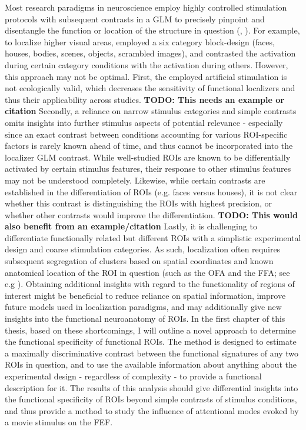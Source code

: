 \documentclass[a4paper, 12pt]{scrreprt}
\begin{document}
Most research paradigms in neuroscience employ highly controlled stimulation protocols with subsequent contrasts in a GLM to precisely pinpoint and disentangle the function or location of the structure in question (\cite{Kanwisher11163},  \cite{fox2009defining}). For example, to localize higher visual areas, \textcite{sengupta2016studyforrest} employed a six category block-design (faces, houses, bodies, scenes, objects, scrambled images), and contrasted the activation during certain category conditions with the activation during others. However, this approach may not be optimal. 
First, the employed artificial stimulation is not ecologically valid, which decreases the sensitivity of functional localizers and thus their applicability across studies. \textbf{TODO: This needs an example or citation} Secondly, a reliance on narrow stimulus categories and simple contrasts omits insights into further stimulus aspects of potential relevance - especially since an exact contrast between conditions accounting for various ROI-specific factors is rarely known ahead of time, and thus cannot be incorporated into the localizer GLM contrast. While well-studied ROIs are known to be differentially activated by certain stimulus features, their response to other stimulus features may not be understood completely. Likewise, while certain contrasts are established in the differentiation of ROIs (e.g. faces versus houses), it is not clear whether this contrast is distinguishing the ROIs with highest precision, or whether other contrasts would improve the differentiation. \textbf{TODO: This would also benefit from an example/citation} Lastly, it is challenging to differentiate functionally related but different ROIs with a simplistic experimental design and coarse stimulation categories. As such, localization often requires subsequent segregation of clusters based on spatial coordinates and known anatomical location of the ROI in question (such as the OFA and the FFA; see e.g \cite{sengupta2016studyforrest}).
Obtaining additional insights with regard to the functionality of regions of interest might be beneficial to reduce reliance on spatial information, improve future models used in localization paradigms, and may additionally give new insights into the functional neuroanatomy of ROIs.\newline
In the first chapter of this thesis, based on these shortcomings, I will outline a novel approach to determine the functional specificity of functional ROIs. The method is designed to estimate a maximally discriminative contrast between the functional signatures of any two ROIs in question, and to use the available information about anything about the experimental design - regardless of complexity - to provide a functional description for it. The results of this analysis should give differential insights into the functional specificity of ROIs beyond simple contrasts of stimulus conditions, and thus provide a method to study the influence of attentional modes evoked by a movie stimulus on the FEF. \newline
\end{document}
